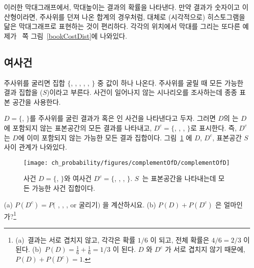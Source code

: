 이러한 막대그래프에서, 막대높이는 결과의 확률을 나타낸다. 만약 결과가 숫자이고 이산형이라면, 주사위를 던져 나온 합계의 경우처럼, 대체로 (시각적으로) 히스토그램을 닮은 막대그래프로 표현하는 것이 편리하다. 각각의 위치에서 막대를 그리는 또다른 예제가 ~\pageref{bookCostDist}쪽 그림~\ref{bookCostDist}에 나와있다.

\subsection{여사건}

주사위를 굴리면 집합 $\{$, , , , , $\}$ 중 값이 하나 나온다. 주사위를 굴릴 때 모든 가능한 결과 집합을  ($S$)이라고 부른다. 
사건이 일어나지 않는 시나리오를 조사하는데 종종 표본 공간을 사용한다.

$D=\{$, $\}$를 주사위를 굴린 결과가  혹은 인 사건을 나타낸다고 두자. 
그러면 $D$의 는 $D$에 포함되지 않는 표본공간의 모든 결과를 나타내고, $D^c = \{$, , , $\}$로 표시한다. 즉, $D^c$는 $D$에 이미 포함되지 않는 가능한 모든 결과 집합이다. 그림~\ref{complementOfD} 에 $D$, $D^c$, 표본공간 $S$ 사이 관계가 나와있다.

\begin{figure}[hht]
\centering
\texttt{[image: ch\_probability/figures/complementOfD/complementOfD]}
\caption{사건 $D=\{$, $\}$와 여사건 $D^c = \{$, , , $\}$. $S$~는 표본공간을 나타내는데 모든 가능한 사건 집합이다.}
\label{complementOfD}
\end{figure}

\begin{exercise}
(a) 
$P(D^c) = P($ , , , or  굴리기$)$ 을 계산하시요. (b) $P(D) + P(D^c)$ 은 얼마인가?\footnote{(a)~결과는 서로 겹치지 않고, 각각은 확률 $1/6$ 이 되고, 전체 확률은 $4/6=2/3$ 이 된다. (b)~$P(D)=\frac{1}{6} + \frac{1}{6} = 1/3$ 이 된다. $D$ 와 $D^c$ 가 서로 겹치지 않기 때문에, $P(D) + P(D^c) = 1$.}
\end{exercise}

